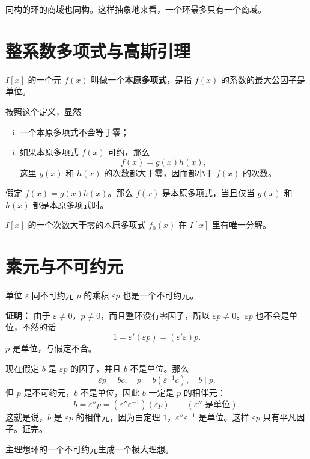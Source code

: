 \begin{theorem}[定理 4：同构的环商域也同构]
同构的环的商域也同构。这样抽象地来看，一个环最多只有一个商域。
\end{theorem}

\section{整系数多项式与高斯引理}

\begin{definition}[本原多项式]
$I[x]$ 的一个元 $f(x)$ 叫做一个\textbf{本原多项式}，是指 $f(x)$ 的系数的最大公因子是单位。

按照这个定义，显然
\begin{enumerate}[(ii)]
  \item 一个本原多项式不会等于零；
  \item[(iii)] 如果本原多项式 $f(x)$ 可约，那么
  \[
    f(x)=g(x)h(x),
  \]
  这里 $g(x)$ 和 $h(x)$ 的次数都大于零，因而都小于 $f(x)$ 的次数。
\end{enumerate}
\end{definition}

\begin{lemma}[引理 1：本原多项式的乘积]
假定 $f(x)=g(x)h(x)$。那么 $f(x)$ 是本原多项式，当且仅当 $g(x)$ 和 $h(x)$ 都是本原多项式时。
\end{lemma}


\begin{lemma}[引理 4：本原多项式的唯一分解]
$I[x]$ 的一个次数大于零的本原多项式 $f_0(x)$ 在 $I[x]$ 里有唯一分解。
\end{lemma}

\section{素元与不可约元}

\begin{theorem}[定理 2：单位乘不可约元还是不可约元]
单位 $\varepsilon$ 同不可约元 $p$ 的乘积 $\varepsilon p$ 也是一个不可约元。

\textbf{证明：} 由于 $\varepsilon{}$，$p$，而且整环没有零因子，所以 $\varepsilon p$。$\varepsilon p$ 也不会是单位，不然的话
\[
1=\varepsilon'(\varepsilon p)=(\varepsilon'\varepsilon)p.
\]
$p$ 是单位，与假定不合。

现在假定 $b$ 是 $\varepsilon p$ 的因子，并且 $b$ 不是单位。那么
\[
\varepsilon p=bc,\quad p=b(\varepsilon^{-1}c),\quad b\mid p.
\]
但 $p$ 是不可约元，$b$ 不是单位，因此 $b$ 一定是 $p$ 的相伴元：
\[
b=\varepsilon''p=(\varepsilon''\varepsilon^{-1})(\varepsilon p)\qquad(\varepsilon''\text{ 是单位}).
\]
这就是说，$b$ 是 $\varepsilon p$ 的相伴元，因为由定理 $1$，$\varepsilon''\varepsilon^{-1}$ 是单位。这样 $\varepsilon p$ 只有平凡因子。证完。
\end{theorem}

\begin{lemma}[引理 2：主理想环的不可约元生成极大理想]
主理想环的一个不可约元生成一个极大理想。
\end{lemma}
